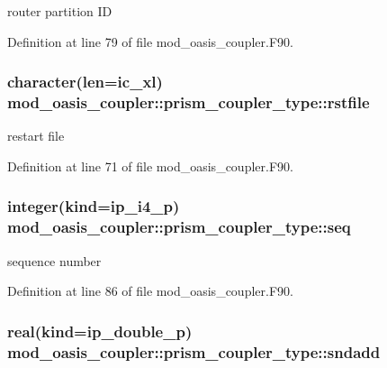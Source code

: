router partition I\+D 



Definition at line 79 of file mod\+\_\+oasis\+\_\+coupler.\+F90.

\hypertarget{structmod__oasis__coupler_1_1prism__coupler__type_a8a660e192210d1e8ff71f7dded631dce}{
\subsubsection[{rstfile}]{\setlength{\rightskip}{0pt plus 5cm}character(len=ic\+\_\+xl) mod\+\_\+oasis\+\_\+coupler\+::prism\+\_\+coupler\+\_\+type\+::rstfile\hspace{0.3cm}{\ttfamily [private]}}}\label{structmod__oasis__coupler_1_1prism__coupler__type_a8a660e192210d1e8ff71f7dded631dce}


restart file 



Definition at line 71 of file mod\+\_\+oasis\+\_\+coupler.\+F90.

\hypertarget{structmod__oasis__coupler_1_1prism__coupler__type_af1766ab1d9fe55670c551a9d0c7f2e00}{
\subsubsection[{seq}]{\setlength{\rightskip}{0pt plus 5cm}integer(kind=ip\+\_\+i4\+\_\+p) mod\+\_\+oasis\+\_\+coupler\+::prism\+\_\+coupler\+\_\+type\+::seq\hspace{0.3cm}{\ttfamily [private]}}}\label{structmod__oasis__coupler_1_1prism__coupler__type_af1766ab1d9fe55670c551a9d0c7f2e00}


sequence number 



Definition at line 86 of file mod\+\_\+oasis\+\_\+coupler.\+F90.

\hypertarget{structmod__oasis__coupler_1_1prism__coupler__type_ad0176e1d6bdcb0f50fc5889921aec8dc}{
\subsubsection[{sndadd}]{\setlength{\rightskip}{0pt plus 5cm}real(kind=ip\+\_\+double\+\_\+p) mod\+\_\+oasis\+\_\+coupler\+::prism\+\_\+coupler\+\_\+type\+::sndadd\hspace{0.3cm}{\ttfamily [private]}}}\label{structmod__oasis__coupler_1_1prism__coupler__type_ad0176e1d6bdcb0f50fc5889921aec8dc}


